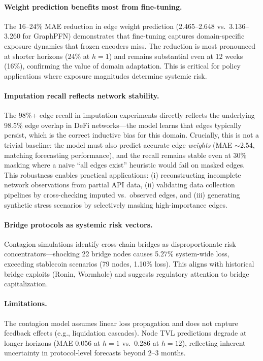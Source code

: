 \paragraph{Weight prediction benefits most from fine-tuning.}
The 16--24\% MAE reduction in edge weight prediction (2.465--2.648 vs.\ 3.136--3.260 for GraphPFN) demonstrates that fine-tuning captures domain-specific exposure dynamics that frozen encoders miss. The reduction is most pronounced at shorter horizons (24\% at $h=1$) and remains substantial even at 12 weeks (16\%), confirming the value of domain adaptation. This is critical for policy applications where exposure magnitudes determine systemic risk.

\paragraph{Imputation recall reflects network stability.}
The 98\%+ edge recall in imputation experiments directly reflects the underlying 98.5\% edge overlap in DeFi networks---the model learns that edges typically persist, which is the correct inductive bias for this domain. Crucially, this is not a trivial baseline: the model must also predict accurate edge \textit{weights} (MAE $\sim$2.54, matching forecasting performance), and the recall remains stable even at 30\% masking where a naive ``all edges exist'' heuristic would fail on masked edges. This robustness enables practical applications: (i) reconstructing incomplete network observations from partial API data, (ii) validating data collection pipelines by cross-checking imputed vs.\ observed edges, and (iii) generating synthetic stress scenarios by selectively masking high-importance edges.

\paragraph{Bridge protocols as systemic risk vectors.}
Contagion simulations identify cross-chain bridges as disproportionate risk concentrators---shocking 22 bridge nodes causes 5.27\% system-wide loss, exceeding stablecoin scenarios (79 nodes, 1.10\% loss). This aligns with historical bridge exploits (Ronin, Wormhole) and suggests regulatory attention to bridge capitalization.

\paragraph{Limitations.}
The contagion model assumes linear loss propagation and does not capture feedback effects (e.g., liquidation cascades). Node TVL predictions degrade at longer horizons (MAE 0.056 at $h=1$ vs.\ 0.286 at $h=12$), reflecting inherent uncertainty in protocol-level forecasts beyond 2--3 months.
